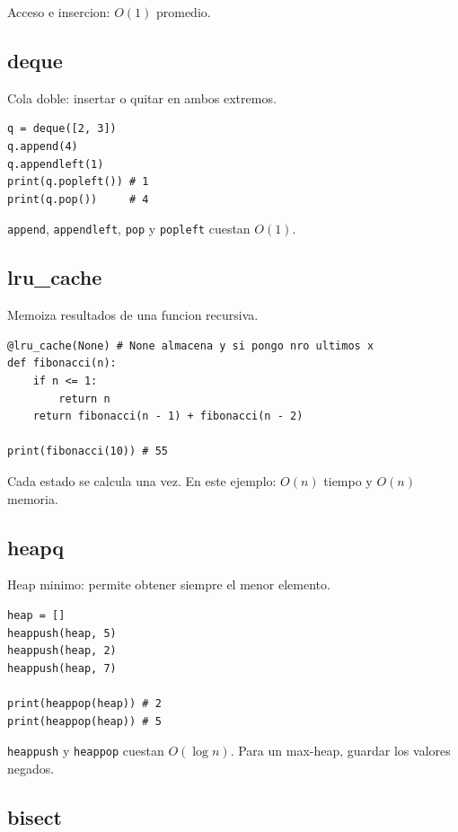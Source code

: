 Acceso e insercion: $O(1)$ promedio.

\subsection{deque}

Cola doble: insertar o quitar en ambos extremos.

\begin{lstlisting}[style=py]
q = deque([2, 3])
q.append(4)
q.appendleft(1)
print(q.popleft()) # 1
print(q.pop())     # 4
\end{lstlisting}

\texttt{append}, \texttt{appendleft}, \texttt{pop} y \texttt{popleft} cuestan
$O(1)$.

\subsection{lru\_cache}

Memoiza resultados de una funcion recursiva.

\begin{lstlisting}[style=py]
@lru_cache(None) # None almacena y si pongo nro ultimos x 
def fibonacci(n):
    if n <= 1:
        return n
    return fibonacci(n - 1) + fibonacci(n - 2)

print(fibonacci(10)) # 55
\end{lstlisting}

Cada estado se calcula una vez. En este ejemplo: $O(n)$ tiempo y $O(n)$ memoria.

\subsection{heapq}

Heap minimo: permite obtener siempre el menor elemento.

\begin{lstlisting}[style=py]
heap = []
heappush(heap, 5)
heappush(heap, 2)
heappush(heap, 7)

print(heappop(heap)) # 2
print(heappop(heap)) # 5
\end{lstlisting}

\texttt{heappush} y \texttt{heappop} cuestan $O(\log n)$.
Para un max-heap, guardar los valores negados.

\subsection{bisect}

